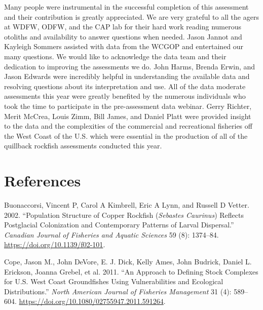 \documentclass[11pt,
  english,
  a4paper,
]{article}
\begin{document}
\leavevmode\tagmcend\tagstructend


Many people were instrumental in the successful completion of this assessment and their contribution is greatly appreciated. We are very grateful to all the agers at WDFW, ODFW, and the CAP lab for their hard work reading numerous otoliths and availability to answer questions when needed. Jason Jannot and Kayleigh Sommers assisted with data from the WCGOP and entertained our many questions. We would like to acknowledge the data team and their dedication to improving the assessments we do. John Harms, Brenda Erwin, and Jason Edwards were incredibly helpful in understanding the available data and resolving questions about its interpretation and use. All of the data moderate assessments this year were greatly benefited by the numerous individuals who took the time to participate in the pre-assessment data webinar. Gerry Richter, Merit McCrea, Louis Zimm, Bill James, and Daniel Platt were provided insight to the data and the complexities of the commercial and recreational fisheries off the West Coast of the U.S. which were essential in the production of all of the quillback rockfish assessments conducted this year.

\leavevmode\tagmcend\tagstructend\par

\clearpage


\hypertarget{references}{%
\section{References}\label{references}}

\leavevmode\tagmcend\tagstructend


\hypertarget{refs}{}
\leavevmode\hypertarget{ref-buonaccorsi_population_2002}{}%
Buonaccorsi, Vincent P, Carol A Kimbrell, Eric A Lynn, and Russell D Vetter. 2002. ``Population Structure of Copper Rockfish (\emph{Sebastes Caurinus}) Reflects Postglacial Colonization and Contemporary Patterns of Larval Dispersal.'' \emph{Canadian Journal of Fisheries and Aquatic Sciences} 59 (8): 1374--84. \url{https://doi.org/10.1139/f02-101}.

\leavevmode\hypertarget{ref-cope_approach_2011}{}%
Cope, Jason M., John DeVore, E. J. Dick, Kelly Ames, John Budrick, Daniel L. Erickson, Joanna Grebel, et al. 2011. ``An Approach to Defining Stock Complexes for U.S. West Coast Groundfishes Using Vulnerabilities and Ecological Distributions.'' \emph{North American Journal of Fisheries Management} 31 (4): 589--604. \url{https://doi.org/10.1080/02755947.2011.591264}.
\end{document}
